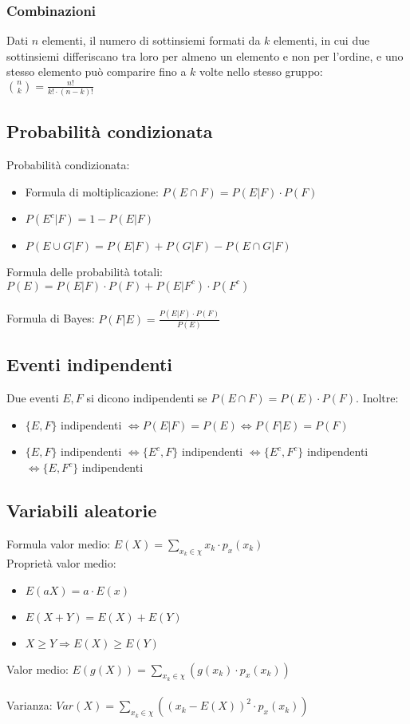 \documentclass[10pt,a4paper]{article}
\begin{document}
\begin{multicols}{2}
\subsubsection*{Combinazioni}
Dati $n$ elementi, il numero di sottinsiemi formati da $k$ elementi, in cui due sottinsiemi differiscano tra loro per almeno un elemento e non per l'ordine, e uno stesso elemento può comparire fino a $k$ volte nello stesso gruppo: ${n \choose k} = \frac{n!}{k!\cdot (n-k)!}$
\subsection*{Probabilità condizionata}
Probabilità condizionata: 
\begin{itemize}
	\item Formula di moltiplicazione: $P(E \cap F) = P(E|F) \cdot P(F)$
	\item $P(E^c|F) = 1-P(E|F)$
	\item $P(E\cup G | F) = P(E|F) + P(G|F) - P(E \cap G |F)$
\end{itemize}
Formula delle probabilità totali: $P(E)=P(E|F) \cdot P(F) + P(E|F^c) \cdot P(F^c)$\\\\
Formula di Bayes: $P(F|E) = \frac{P(E|F) \cdot P(F)}{P(E)}$ 
\subsection*{Eventi indipendenti}
Due eventi $E,F$ si dicono indipendenti se $P(E \cap F) = P(E) \cdot P(F)$. Inoltre:
\begin{itemize}
	\item $\{E,F\}$ indipendenti $\iff P(E|F)=P(E) \iff P(F|E)=P(F)$
	\item $\{E,F\}$ indipendenti $\iff \{E^c,F\}$ indipendenti $\iff \{E^c,F^c\}$ indipendenti $\iff \{E,F^c\}$ indipendenti
\end{itemize}

\subsection*{Variabili aleatorie}
Formula valor medio: $E(X) = \sum\limits_{x_k \in \chi} x_k \cdot p_x(x_k)$\\
Proprietà valor medio:
\begin{itemize}
\item $E(aX) = a\cdot E(x)$
\item $E(X+Y) = E(X) + E(Y)$
\item $X \geq Y \Rightarrow E(X) \geq E(Y)$
\end{itemize}
Valor medio:
$E(g(X)) = \sum\limits_{x_k \in \chi} (g(x_k)\cdot p_x(x_k))$\\\\
Varianza: $Var(X) = \sum\limits_{x_k \in \chi}((x_k-E(X))^2\cdot p_x(x_k))$\\


\end{multicols}
\end{document}
